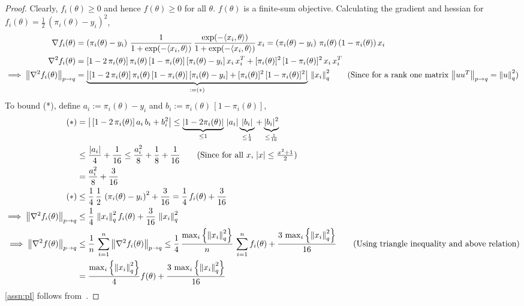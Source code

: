 \documentclass{article}
\newcommand{\normsq}[1]{\left\|#1 \right\|^{2}}
\newcommand{\norm}[1]{\left\|#1 \right\|}
\begin{document}
\begin{proof}
Clearly, $f_i(\theta) \geq 0$ and hence $f(\theta) \geq 0$ for all $\theta$. $f(\theta)$ is a finite-sum objective. Calculating the gradient and hessian for $f_i(\theta) = \frac{1}{2} \, \left(\pi_i(\theta) - y_i \right)^2$, 
\begin{align*}
\nabla f_i(\theta) &= \left(\pi_i(\theta) - y_i \right) \, \frac{1}{1 + \exp(-\langle x_i, \theta \rangle)} \, \frac{\exp(-\langle x_i, \theta \rangle)}{1 + \exp(-\langle x_i, \theta \rangle)} \, x_i = \left(\pi_i(\theta) - y_i \right) \, \pi_i(\theta) \, (1 - \pi_i(\theta)) \, x_i \\
\nabla^2 f_i(\theta) &= 
[1 - 2 \, \pi_i(\theta)] \, \pi_i(\theta) \, [1 - \pi_i(\theta)] \, [\pi_i(\theta) - y_i] \, x_i \, x_i^T + [\pi_i(\theta)]^2 \, [1 - \pi_i(\theta)]^2 \, x_i \, x_i^T \\
\implies \norm{\nabla^2 f_i(\theta)}_{p \to q} &= \underbrace{\left\vert[1 - 2 \, \pi_i(\theta)] \, \pi_i(\theta) \, [1 - \pi_i(\theta)] \, [\pi_i(\theta) - y_i] + [\pi_i(\theta)]^2 \, [1 - \pi_i(\theta)]^2 \right\vert}_{:= (*)} \, \normsq{x_i}_{q} \tag{Since for a rank one matrix $\norm{u u^T}_{p \to q} = \normsq{u}_q$} 
\end{align*}
To bound (*), define $a_i := \pi_i(\theta) - y_i$ and $b_i := \pi_i(\theta) \, [1 - \pi_i(\theta)]$, 
\begin{align*}
(*) &= \left\vert \, [1 - 2 \, \pi_i(\theta)] \, a_i \, b_i + b_i^2 \right\vert \leq \underbrace{|1 - 2 \pi_i(\theta)|}_{\leq 1} \, |a_i| \underbrace{|b_i|}_{\leq \frac{1}{4}} + \underbrace{|b_i|^2}_{\leq \frac{1}{16}} \\
& \leq \frac{|a_i|}{4} + \frac{1}{16} \leq \frac{a_i^2}{8} + \frac{1}{8} + \frac{1}{16} \tag{Since for all $x$, $|x| \leq \frac{x^2 + 1}{2}$} \\
& = \frac{a_i^2}{8} + \frac{3}{16} \\
(*) & \leq \frac{1}{4} \, \frac{1}{2} \, \left(\pi_i(\theta) - y_i \right)^2 + \frac{3}{16} = \frac{1}{4} \, f_i(\theta) + \frac{3}{16} \\
\implies \norm{\nabla^2 f_i(\theta)}_{p \to q} & \leq \frac{1}{4} \,  \normsq{x_i}_{q}f_i(\theta) + \frac{3}{16} \,  \normsq{x_i}_{q} \\
\implies \norm{\nabla^2 f(\theta)}_{p \to q} & \leq \frac{1}{n} \,\sum_{i = 1}^{n} \norm{\nabla^2 f_i(\theta)}_{p \to q} \leq  \frac{1}{4} \, \frac{\max_i \left\{\normsq{x_i}_{q}\right\}}{n} \, \sum_{i = 1}^{n} f_i(\theta) + \frac{3 \, \max_i \left\{\normsq{x_i}_{q}\right\}}{16} \tag{Using triangle inequality and above relation} \\
& = \frac{\max_i \left\{\normsq{x_i}_{q}\right\}}{4}f(\theta) + \frac{3 \, \max_i \left\{\normsq{x_i}_{q}\right\}}{16} 
\end{align*}
\cref{assn:pl} follows from~\citep[Lemma 9]{mei2021leveraging}. 
\end{proof}
\end{document}
